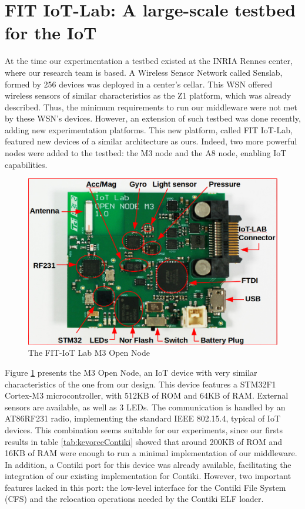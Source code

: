 \section{FIT IoT-Lab: A large-scale testbed for the IoT}
\label{sec:iotlab}
At the time our experimentation a testbed existed at the INRIA Rennes center, where our research team is based.
A Wireless Sensor Network called Senslab\cite{des2011senslab}, formed by 256 devices was deployed in a center's cellar.
This WSN offered wireless sensors of similar characteristics as the Z1 platform, which was already described.
Thus, the minimum requirements to run our middleware were not met by these WSN's devices.
However, an extension of such testbed was done recently, adding new experimentation platforms.
This new platform, called FIT IoT-Lab\cite{Fleury15iotlab}, featured new devices of a similar architecture as ours.
Indeed, two more powerful nodes were added to the testbed: the M3 node and the A8 node, enabling IoT capabilities.

\begin{figure}[htb]
	\centering
	\includegraphics[width=0.7\columnwidth]{chapters/modelsAtRuntimeContiki.images/m3opennode.png}
	\caption{The FIT-IoT Lab M3 Open Node} \label{fig:M3OpenNode}
\end{figure}

Figure \ref{fig:M3OpenNode} presents the M3 Open Node, an IoT device with very similar characteristics of the one from our design.
This device features a STM32F1 Cortex-M3 microcontroller, with 512KB of ROM and 64KB of RAM.
External sensors are available, as well as 3 LEDs.
The communication is handled by an AT86RF231 radio, implementing the standard IEEE 802.15.4, typical of IoT devices.
This combination seems suitable for our experiments, since our firsts results in table \ref{tab:kevoreeContiki} showed that around 200KB of ROM and 16KB of RAM were enough to run a minimal implementation of our middleware.
In addition, a Contiki port for this device was already available, facilitating the integration of our existing implementation for Contiki.
However, two important features lacked in this port: the low-level interface for the Contiki File System (CFS) and the relocation operations needed by the Contiki ELF loader.

